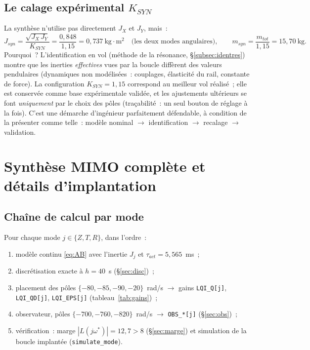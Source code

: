 \documentclass[a4paper,11pt]{article}
\begin{document}
\subsection{Le calage expérimental $K_{SYN}$}

La synthèse n'utilise pas directement $J_X$ et $J_Y$, mais~:
\begin{equation}
    J_{syn} = \frac{\sqrt{J_X\,J_Y}}{K_{SYN}} = \frac{0{,}848}{1{,}15}
            = 0{,}737\ \text{kg}\cdot\text{m}^2
    \quad\text{(les deux modes angulaires)},
    \qquad
    m_{syn} = \frac{m_{tot}}{1{,}15} = 15{,}70\ \text{kg}.
\end{equation}
Pourquoi~? L'identification en vol (méthode de la résonance,
§\ref{subsec:identres}) montre que les inerties \emph{effectives} vues par la
boucle diffèrent des valeurs pendulaires (dynamiques non modélisées~:
couplages, élasticité du rail, constante de force). La configuration
$K_{SYN} = 1{,}15$ correspond au meilleur vol réalisé~; elle est conservée
comme base expérimentale validée, et les ajustements ultérieurs se font
\emph{uniquement} par le choix des pôles (traçabilité~: un seul bouton de
réglage à la fois). C'est une démarche d'ingénieur parfaitement défendable, à
condition de la présenter comme telle~: modèle nominal $\to$ identification
$\to$ recalage $\to$ validation.

\section{Synthèse MIMO complète et détails d'implantation}
\label{sec:synthmimo}

\subsection{Chaîne de calcul par mode}

Pour chaque mode $j \in \{Z, T, R\}$, dans l'ordre~:
\begin{enumerate}
    \item modèle continu \eqref{eq:AB} avec l'inertie $J_j$ et
          $\tau_{act} = 5{,}565$~ms~;
    \item discrétisation exacte à $h = 40$~\textmu s (§\ref{sec:disc})~;
    \item placement des pôles $\{-80,-85,-90,-20\}$~rad/s $\to$ gains
          \texttt{LQI\_Q[j]}, \texttt{LQI\_QD[j]}, \texttt{LQI\_EPS[j]}
          (tableau~\ref{tab:gains})~;
    \item observateur, pôles $\{-700,-760,-820\}$~rad/s $\to$
          \texttt{OBS\_*[j]} (§\ref{sec:obs})~;
    \item vérification~: marge $|L(j\omega^*)| = 12{,}7 > 8$
          (§\ref{sec:marge}) et simulation de la boucle implantée
          (\texttt{simulate\_mode}).
\end{enumerate}
\end{document}
